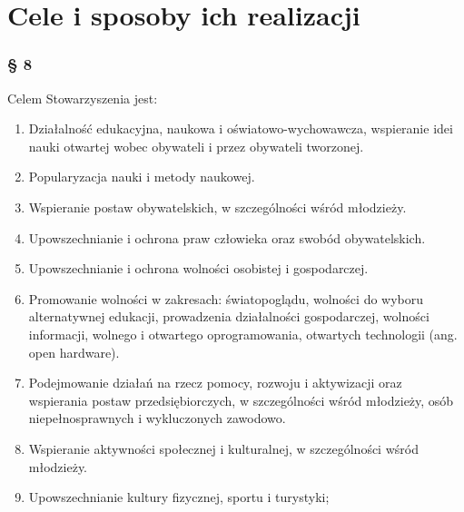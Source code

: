 \documentclass{article}
\newcommand{\myparagraph}[1]{\subsubsection*{#1}}
\begin{document}
\section{Cele i sposoby ich realizacji}
\myparagraph{§ 8}
Celem Stowarzyszenia jest:
\begin{enumerate}
\item
  Działalność edukacyjna, naukowa i oświatowo-wychowawcza, wspieranie idei nauki otwartej wobec obywateli i przez obywateli tworzonej.
\item
  Popularyzacja nauki i metody naukowej.
\item
  Wspieranie postaw obywatelskich, w szczególności wśród młodzieży.
\item
  Upowszechnianie i ochrona praw człowieka oraz swobód obywatelskich.
\item
  Upowszechnianie i ochrona wolności osobistej i gospodarczej.
\item
  Promowanie wolności w zakresach: światopoglądu, wolności do wyboru alternatywnej edukacji, prowadzenia działalności gospodarczej,
  wolności informacji, wolnego i otwartego oprogramowania, otwartych technologii (ang. open hardware).
\item
  Podejmowanie działań na rzecz pomocy, rozwoju i aktywizacji oraz wspierania postaw przedsiębiorczych, w szczególności wśród młodzieży, osób niepełnosprawnych i wykluczonych zawodowo.
\item
  Wspieranie aktywności społecznej i kulturalnej, w szczególności wśród młodzieży.
\item
  Upowszechnianie kultury fizycznej, sportu i turystyki;
\end{enumerate}
\end{document}
